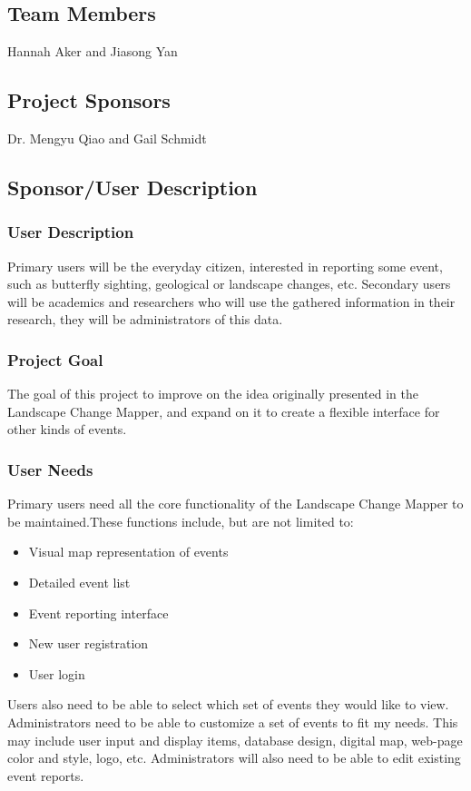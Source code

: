 
\subsection{Team Members}
Hannah Aker and Jiasong Yan
\subsection{Project Sponsors}
Dr. Mengyu Qiao and Gail Schmidt
\subsection{Sponsor/User Description}
\subsubsection{User Description}
Primary users will be the everyday citizen, interested in reporting some event, such as butterfly sighting, geological or landscape changes, etc. Secondary users will be academics and researchers who will use the gathered information in their research, they will be administrators of this data.
\subsubsection{Project Goal}
The goal of this project to improve on the idea originally presented in the Landscape Change Mapper, and expand on it to create a flexible interface for other kinds of events.
\subsubsection{User Needs}
Primary users need all the core functionality of the Landscape Change Mapper to be maintained.These functions include, but are not limited to:
\begin{itemize}
\item Visual map representation of events
\item Detailed event list
\item Event reporting interface
\item New user registration
\item User login
\end{itemize}
Users also need to be able to select which set of events they would like to view.
Administrators need to be able to customize a set of events to fit my needs. This may include user input and display items, database design, digital map, web-page color and style, logo, etc. Administrators will also need to be able to edit existing event reports.
